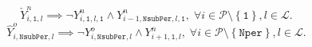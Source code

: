 \documentclass{amsbook}
\begin{document}
\begin{equation}
    \check{Y}^n_{i,\mathtt{1},l} \implies 
    \neg Y^n_{i,\mathtt{1},l,\mathtt{1}} \wedge 
    Y^n_{i-1,\mathtt{NsubPer},l,\mathtt{1}}, \;
    \forall 
    i \in \mathcal{P} \setminus \left\{\mathtt{1}\right\},
    l \in \mathcal{L}.
\end{equation}
%
%
\begin{equation}
    \hat{Y}^o_{i,\mathtt{NsubPer},l} \implies 
    \neg Y^o_{i,\mathtt{NsubPer},l} \wedge 
    Y^n_{i+1,\mathtt{1},l}, \;
    \forall 
    i \in \mathcal{P} \setminus \left\{\mathtt{Nper}\right\},
    l \in \mathcal{L}.
\end{equation}
\end{document}
